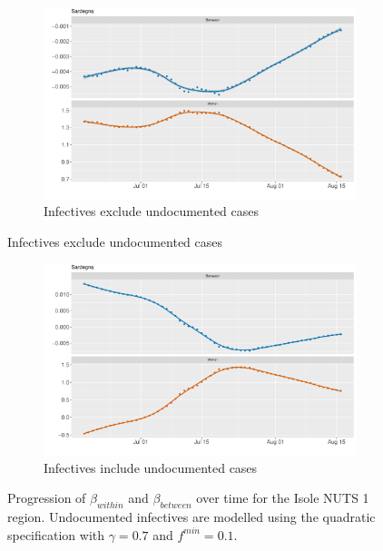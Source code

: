 \documentclass[12pt]{article}
\begin{document}
\begin{appendices}
		\begin{figure}[H]
    	    \centering
    	    \begin{subfigure}{\textwidth}
    	      \centering
    	      \includegraphics[width=0.8\linewidth]{output/model_between_lag14_betas_Isole_rolling.pdf}
    	      \caption{Infectives exclude undocumented cases}
    	      \label{fig:beta_between_over_time_isole_regular}
    	    \end{subfigure}
        \end{figure}
        \begin{figure}[H]\ContinuedFloat
    	    \begin{subfigure}{\textwidth}
    	      \centering
    	      \includegraphics[width=0.8\linewidth]{output/model_between_lag14_betas_Isole_UndocQuadratic_rolling.pdf}
    	      \caption{Infectives include undocumented cases}
    	      \label{fig:beta_between_over_time_isole_regular_undoc}
    	    \end{subfigure}
    	    \caption{Progression of $\beta_{within}$ and $\beta_{between}$ over time for the Isole NUTS 1 region. Undocumented infectives are modelled using the quadratic specification with $\gamma = 0.7$ and $f^{min}=0.1$.}
    	    \label{fig:beta_between_over_time_isole}
        \end{figure}
		

\end{appendices}
\end{document}
